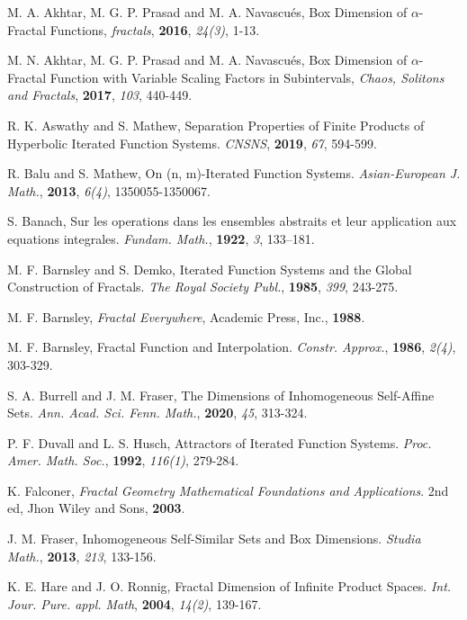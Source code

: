 \documentclass[10pt]{amsart}
\theoremstyle{definition}
\begin{document}
	
	\begin{thebibliography}{}
		
		
		  M. A. Akhtar, M. G. P. Prasad and M. A.  Navascu\'{e}s, Box Dimension of $\alpha$-Fractal Functions, {\em fractals}, {\bf 2016}, {\em 24(3)}, 1-13.
		
		 M. N. Akhtar, M. G. P. Prasad and M. A.  Navascu\'{e}s,  Box Dimension of $\alpha$-Fractal Function with Variable Scaling Factors in Subintervals, {\em Chaos, Solitons and Fractals}, {\bf 2017}, {\em 103}, 440-449.
		
		R. K. Aswathy and S. Mathew, Separation Properties of Finite Products of Hyperbolic Iterated Function Systems. {\em CNSNS}, {\bf 2019}, {\em 67}, 594-599.
		
		 R. Balu and S. Mathew, On (n, m)-Iterated Function Systems. {\em Asian-European J. Math.}, {\bf 2013}, {\em 6(4)}, 1350055-1350067.
		
		 S. Banach,  Sur les operations dans les ensembles abstraits et leur application aux equations integrales. {\em Fundam. Math.}, {\bf 1922}, {\em 3}, 133–181.
		
		  M. F. Barnsley and S.  Demko,  Iterated Function Systems and the Global Construction of Fractals. {\em The Royal Society Publ.}, {\bf 1985}, {\em 399}, 243-275.
		
		 M. F. Barnsley,  {\em Fractal Everywhere}, Academic Press, Inc., {\bf 1988}.
		
		 M. F. Barnsley,  Fractal Function and Interpolation. {\em Constr. Approx.}, {\bf 1986}, {\em 2(4)}, 303-329.	
		
		 S. A. Burrell and J. M. Fraser, The Dimensions of Inhomogeneous Self-Affine Sets. {\em Ann. Acad. Sci. Fenn. Math.}, {\bf 2020}, {\em 45}, 313-324.
		
		  P. F. Duvall and L. S.  Husch,    Attractors of Iterated Function Systems. {\em Proc. Amer. Math. Soc.}, {\bf 1992}, {\em 116(1)},  279-284.
		
		 K. Falconer,  {\em Fractal Geometry Mathematical Foundations and Applications}. 2nd ed,  Jhon Wiley and Sons, {\bf 2003}.
		
		 J. M. Fraser,  Inhomogeneous Self-Similar Sets and Box Dimensions. {\em Studia Math.}, {\bf 2013}, {\em 213}, 133-156.
		
		 K. E. Hare and J. O. Ronnig,  Fractal Dimension of Infinite Product Spaces. {\em Int. Jour. Pure. appl. Math}, {\bf 2004}, {\em 14(2)}, 139-167.
		

\end{thebibliography}
\end{document}
